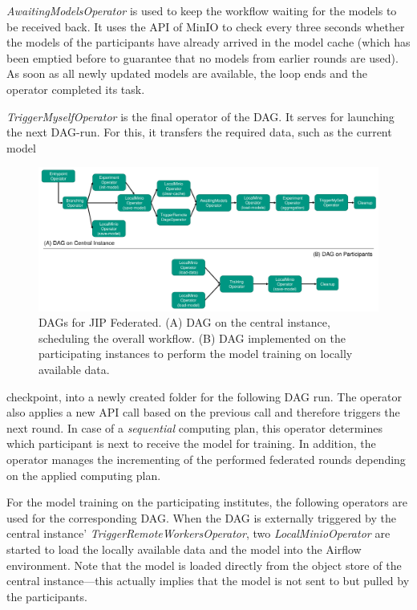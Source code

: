 \textit{AwaitingModelsOperator} is used to keep the workflow waiting for the models to be received back. It uses the API of MinIO to check every three seconds whether the models of the participants have already arrived in the model cache (which has been emptied before to guarantee that no models from earlier rounds are used). As soon as all newly updated models are available, the loop ends and the operator completed its task.

\textit{TriggerMyselfOperator} is the final operator of the DAG.
It serves for launching the next DAG-run. For this, it transfers the required data, such as the current model

\begin{figure}
    \centerline{\includegraphics[width=1\textwidth]{1_Figures/DAG_KaapanaFed.pdf}}
    \caption[Detailed illustration of DAGs for JIP Federated]{DAGs for JIP Federated. (A) DAG on the central instance, scheduling the overall workflow. (B) DAG implemented on the participating instances to perform the model training on locally available data.}
\label{fig:DetailedDAG_KaapanaFed}
\end{figure}

checkpoint, into a newly created folder for the following DAG run. The operator also applies a new API call based on the previous call and therefore triggers the next round. In case of a \textit{sequential} computing plan, this operator determines which participant is next to receive the model for training. In addition, the operator manages the incrementing of the performed federated rounds depending on the applied computing plan.

For the model training on the participating institutes, the following operators are used for the corresponding DAG.
When the DAG is externally triggered by the central instance' \textit{TriggerRemoteWorkersOperator}, two \textit{LocalMinioOperator} are started to load the locally available data and the model into the Airflow environment. Note that the model is loaded directly from the object store of the central instance---this actually implies that the model is not sent to but pulled by the participants.


